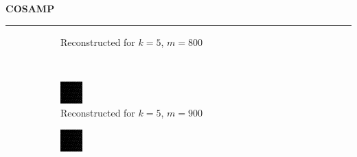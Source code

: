 \documentclass[a4paper,12pt]{article}
\newenvironment{solution}[2][]{%
    \begin{mdframed}[linecolor=blue!70!black, linewidth=2pt, roundcorner=10pt, backgroundcolor=yellow!10!white, skipabove=12pt, skipbelow=12pt]%
        \textbf{\large #2}
        \par\noindent\rule{\textwidth}{0.4pt}
}{
    \end{mdframed}
}
\begin{document}
\begin{solution}{COSAMP}
\begin{figure}[H]
\begin{subfigure}[t]{0.23\textwidth}
            \caption{Reconstructed for $k = 5$, $m = 800$}
        \end{subfigure}\\
        \begin{subfigure}[t]{0.23\textwidth}
            \centering
            \includegraphics[width=\textwidth]{../images/cosamp/Reconstructed_k_5_m_900.png}
            \caption{Reconstructed for $k = 5$, $m = 900$}
        \end{subfigure}
        \begin{subfigure}[t]{0.23\textwidth}
            \centering
            \includegraphics[width=\textwidth]{../images/cosamp/Reconstructed_k_5_m_1000.png}

\end{subfigure}
\end{figure}
\end{solution}
\end{document}
